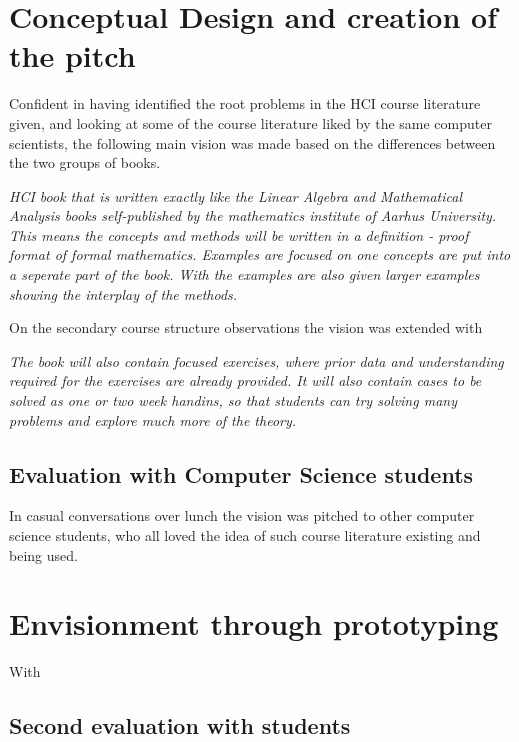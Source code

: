 \section{Conceptual Design and creation of the pitch}
Confident in having identified the root problems in the HCI course literature given, and looking at some of the course literature liked by the same computer scientists, the following main vision was made based on the differences between the two groups of books.
\begin{displayquote}
  \emph{ HCI book that is written exactly like the Linear Algebra and Mathematical Analysis books self-published by the mathematics institute of Aarhus University. This means the concepts and methods will be written in a \emph{definition - proof} format of formal mathematics. Examples are focused on one concepts are put into a seperate part of the book. With the examples are also given larger examples showing the interplay of the methods.}
\end{displayquote}
On the secondary course structure observations the vision was extended with
\begin{displayquote}
  \emph{The book will also contain focused exercises, where prior data and understanding required for the exercises are already provided. It will also contain cases to be solved as one or two week handins, so that students can try solving many problems and explore much more of the theory.}
\end{displayquote}


\subsection{Evaluation with Computer Science students}
In casual conversations over lunch the vision was pitched to other computer science students, who all loved the idea of such course literature existing and being used.

\section{Envisionment through prototyping}
With 

\subsection{Second evaluation with students}


